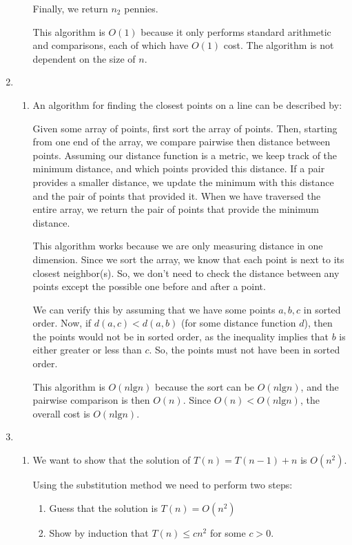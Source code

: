 \documentclass[12pt,letterpaper]{article}
\newcommand{\lb}[0]{\text{lg}}
\begin{document}
\begin{enumerate}
\begin{enumerate}
          Finally, we return $n_2$ pennies.

          This algorithm is $O(1)$ because it only performs standard arithmetic and comparisons, each of which have $O(1)$ cost.
          The algorithm is not dependent on the size of $n$.
      \end{enumerate}

    \item
      \begin{enumerate}
        \item An algorithm for finding the closest points on a line can be described by:

          Given some array of points, first sort the array of points.
          Then, starting from one end of the array, we compare pairwise then distance between points.
          Assuming our distance function is a metric, we keep track of the minimum distance, and which points provided this distance.
          If a pair provides a smaller distance, we update the minimum with this distance and the pair of points that provided it.
          When we have traversed the entire array, we return the pair of points that provide the minimum distance.

          This algorithm works because we are only measuring distance in one dimension.
          Since we sort the array, we know that each point is next to its closest neighbor(s).
          So, we don't need to check the distance between any points except the possible one before and after a point.

          We can verify this by assuming that we have some points $a, b, c$ in sorted order.
          Now, if $d(a, c) < d(a, b)$ (for some distance function $d$), then the points would not be in sorted order, as the inequality implies that $b$ is either greater or less than $c$. So, the points must not have been in sorted order.

          This algorithm is $O(n\lb{n})$ because the sort can be $O(n\lb{n})$, and the pairwise comparison is then $O(n)$.
          Since $O(n) < O(n\lb{n})$, the overall cost is $O(n\lb{n})$.
      \end{enumerate}

    \item
      \begin{enumerate}
        \item
          We want to show that the solution of $T(n) = T(n-1) + n$ is $O(n^2)$.

          Using the substitution method we need to perform two steps:
          \begin{enumerate}
            \item Guess that the solution is $T(n) = O(n^2)$
            \item Show by induction that $T(n) \le cn^2$ for some $c > 0$.


\end{enumerate}
\end{enumerate}
\end{enumerate}
\end{document}
